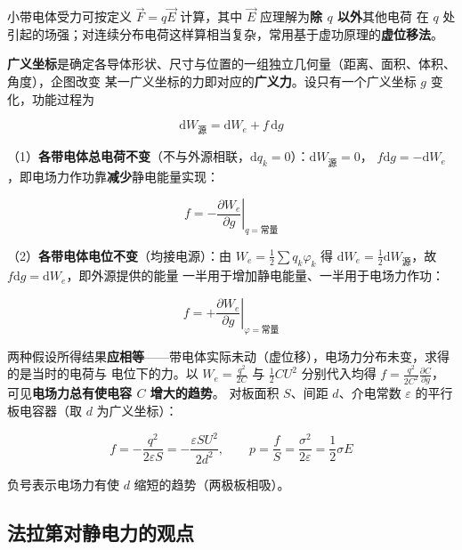 小带电体受力可按定义 $\vec{F}=q\vec{E}$ 计算，其中 $\vec{E}$ 应理解为\textbf{除 $q$ 以外}其他电荷
在 $q$ 处引起的场强；对连续分布电荷这样算相当复杂，常用基于虚功原理的\textbf{虚位移法}。

\textbf{广义坐标}是确定各导体形状、尺寸与位置的一组独立几何量（距离、面积、体积、角度），企图改变
某一广义坐标的力即对应的\textbf{广义力}。设只有一个广义坐标 $g$ 变化，功能过程为
\begin{formulaBox}
\[
\mathrm{d}W_{\text{源}}=\mathrm{d}W_e+f\,\mathrm{d}g
\]
\end{formulaBox}

（1）\textbf{各带电体总电荷不变}（不与外源相联，$\mathrm{d}q_k=0$）：$\mathrm{d}W_{\text{源}}=0$，
$f\mathrm{d}g=-\mathrm{d}W_e$，即电场力作功靠\textbf{减少}静电能量实现：
\begin{formulaBox}
\[
f=-\left.\frac{\partial W_e}{\partial g}\right|_{q=\text{常量}}
\]
\end{formulaBox}

（2）\textbf{各带电体电位不变}（均接电源）：由 $W_e=\frac12\sum q_k\varphi_k$ 得
$\mathrm{d}W_e=\frac12\mathrm{d}W_{\text{源}}$，故 $f\mathrm{d}g=\mathrm{d}W_e$，即外源提供的能量
一半用于增加静电能量、一半用于电场力作功：
\begin{formulaBox}
\[
f=+\left.\frac{\partial W_e}{\partial g}\right|_{\varphi=\text{常量}}
\]
\end{formulaBox}

两种假设所得结果\textbf{应相等}——带电体实际未动（虚位移），电场力分布未变，求得的是当时的电荷与
电位下的力。以 $W_e=\frac{q^2}{2C}$ 与 $\frac12CU^2$ 分别代入均得
$f=\frac{q^2}{2C^2}\frac{\partial C}{\partial g}$，可见\textbf{电场力总有使电容 $C$ 增大的趋势}。
对板面积 $S$、间距 $d$、介电常数 $\varepsilon$ 的平行板电容器（取 $d$ 为广义坐标）：
\begin{formulaBox}
\[
f=-\frac{q^2}{2\varepsilon S}=-\frac{\varepsilon SU^2}{2d^2},
\qquad
p=\frac{f}{S}=\frac{\sigma^2}{2\varepsilon}=\frac{1}{2}\sigma E
\]
\end{formulaBox}

负号表示电场力有使 $d$ 缩短的趋势（两极板相吸）。


\subsection{法拉第对静电力的观点}

